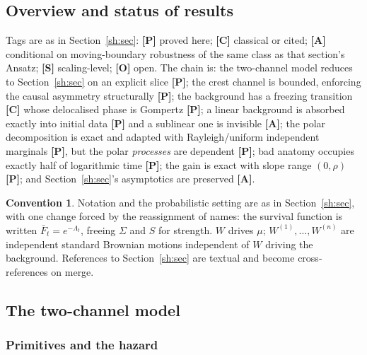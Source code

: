 \documentclass[11pt]{article}
\numberwithin{equation}{section}
\theoremstyle{plain}
\theoremstyle{definition}
\newtheorem{convention}[theorem]{Convention}
\theoremstyle{remark}
\begin{document}
\subsection*{Overview and status of results}

Tags are as in Section~\ref{sh:sec}: \textbf{[P]} proved here; \textbf{[C]}
classical or cited; \textbf{[A]} conditional on moving-boundary
robustness of the same class as that section's Ansatz; \textbf{[S]}
scaling-level; \textbf{[O]} open. The chain is: the two-channel model
reduces to Section~\ref{sh:sec} on an explicit slice \textbf{[P]}; the crest
channel is bounded, enforcing the causal asymmetry structurally
\textbf{[P]}; the background has a freezing transition \textbf{[C]}
whose delocalised phase is Gompertz \textbf{[P]}; a linear background is
absorbed exactly into initial data \textbf{[P]} and a sublinear one is
invisible \textbf{[A]}; the polar decomposition is exact and adapted
with Rayleigh/uniform independent marginals \textbf{[P]}, but the polar
\emph{processes} are dependent \textbf{[P]}; bad anatomy occupies
exactly half of logarithmic time \textbf{[P]}; the gain is exact with
slope range $(0,\rho)$ \textbf{[P]}; and Section~\ref{sh:sec}'s asymptotics are
preserved \textbf{[A]}.

\begin{convention}\label{tc:conv}
Notation and the probabilistic setting are as in Section~\ref{sh:sec}, with one
change forced by the reassignment of names: the survival function is
written $\bar F_t=e^{-\Lambda_t}$, freeing $\Sigma$ and $S$ for
strength. $W$ drives $\mu$; $W^{(1)},\dots,W^{(n)}$ are independent
standard Brownian motions independent of $W$ driving the background.
References to Section~\ref{sh:sec} are textual and become cross-references on
merge.
\end{convention}

\subsection{The two-channel model}\label{tc:sub:model}

\subsubsection{Primitives and the hazard}\label{tc:subsub:primitives}
\end{document}

